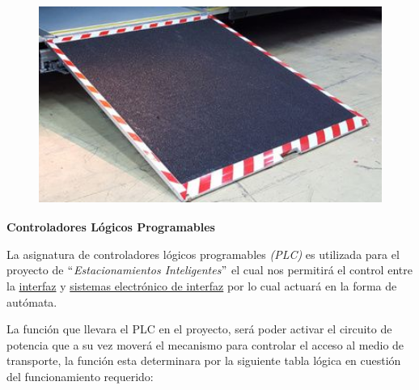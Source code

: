 \documentclass[12pt]{article}
\begin{document}
\begin{figure}[H]
	\begin{Center}
		\includegraphics[width=4.53in,height=2.58in]{./media/image8.png}
	\end{Center}
\end{figure}




\par
\newpage
\textbf{Controladores Lógicos Programables}\par


\vspace{\baselineskip}
{\fontsize{11pt}{13.2pt}\selectfont La asignatura de controladores lógicos programables \textit{(PLC) }es utilizada para el proyecto de \textit{$``$Estacionamientos Inteligentes$"$  }el cual nos permitirá el control entre la \uline{interfaz} y \uline{sistemas electrónico de interfaz} por lo cual actuará en la forma de autómata.\par}\par


\vspace{\baselineskip}

\vspace{\baselineskip}
{\fontsize{11pt}{13.2pt}\selectfont La función que llevara el PLC en el proyecto, será poder activar el circuito de potencia que a su vez moverá el mecanismo para controlar el acceso al medio de transporte, la función esta determinara por la siguiente tabla lógica en cuestión del funcionamiento requerido:\par}\par
\end{document}
